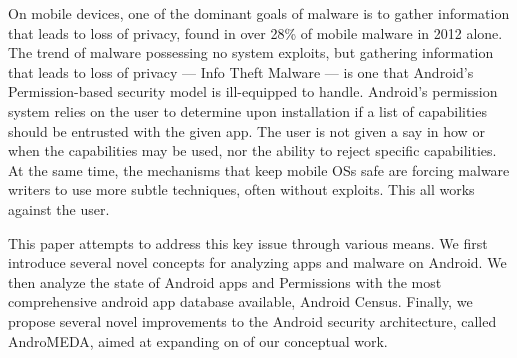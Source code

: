  On mobile devices, one of the dominant goals of malware is to gather information that leads to loss of privacy, found in over 28\% of mobile malware in 2012 alone\citep{nq2013}. The trend of malware possessing no system exploits, but gathering information that leads to loss of privacy --- Info Theft Malware --- is one that Android's Permission-based security model is ill-equipped to handle. Android's permission system relies on the user to determine upon installation if a list of capabilities should be entrusted with the given app. The user is not given a say in how or when the capabilities may be used, nor the ability to reject specific capabilities. At the same time, the mechanisms that keep mobile OSs safe are forcing malware writers to use more subtle techniques, often without exploits. This all works against the user.

This paper attempts to address this key issue through various means. We first introduce several novel concepts for analyzing apps and malware on Android. We then analyze the state of Android apps and Permissions with the most comprehensive android app database available, Android Census. Finally, we propose several novel improvements to the Android security architecture, called AndroMEDA, aimed at expanding on of our conceptual work.

